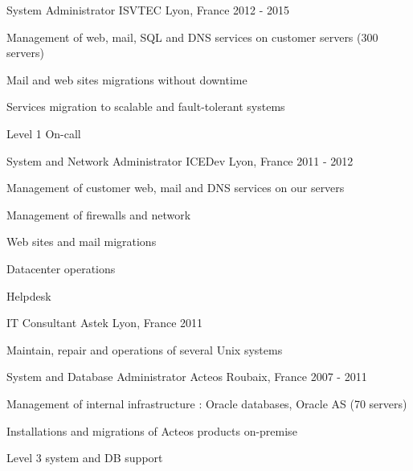 \begin{cventries}
\cventry
{System Administrator} %
{ISVTEC} %
{Lyon, France} %
{2012 - 2015} %
{ %
\begin{cvitems}
\item Management of web, mail, SQL and DNS services on customer servers (300 servers)
\item Mail and web sites migrations without downtime
\item Services migration to scalable and fault-tolerant systems
\item Level 1 On-call
\end{cvitems}
}


\cventry
{System and Network Administrator} %
{ICEDev} %
{Lyon, France} %
{2011 - 2012} %
{ %
\begin{cvitems}
\item Management of customer web, mail and DNS services on our servers
\item Management of firewalls and network
\item Web sites and mail migrations
\item Datacenter operations
\item Helpdesk
\end{cvitems}
}


\cventry
{IT Consultant} %
{Astek} %
{Lyon, France} %
{2011} %
{ %
\begin{cvitems}
\item Maintain, repair and operations of several Unix systems
\end{cvitems}
}


\cventry
{System and Database Administrator} %
{Acteos} %
{Roubaix, France} %
{2007 - 2011} %
{ %
\begin{cvitems}
\item Management of internal infrastructure : Oracle databases, Oracle AS (70 servers)
\item Installations and migrations of Acteos products on-premise
\item Level 3 system and DB support
\end{cvitems}
}


\end{cventries}
